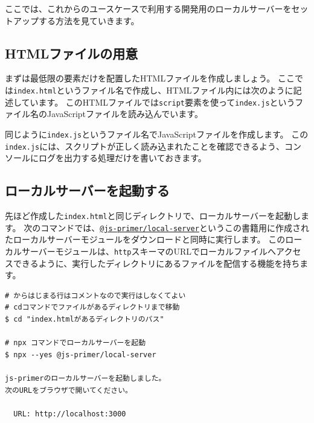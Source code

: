 ここでは、これからのユースケースで利用する開発用のローカルサーバーをセットアップする方法を見ていきます。

\hypertarget{preparing-html}{%
\subsection{HTMLファイルの用意}\label{preparing-html}}

まずは最低限の要素だけを配置したHTMLファイルを作成しましょう。
ここでは\texttt{index.html}というファイル名で作成し、HTMLファイル内には次のように記述しています。
このHTMLファイルでは\texttt{script}要素を使って\texttt{index.js}というファイル名のJavaScriptファイルを読み込んでいます。



同じように\texttt{index.js}というファイル名でJavaScriptファイルを作成します。
この\texttt{index.js}には、スクリプトが正しく読み込まれたことを確認できるよう、コンソールにログを出力する処理だけを書いておきます。



\hypertarget{open-js-primer-local-server}{%
\subsection{ローカルサーバーを起動する}\label{open-js-primer-local-server}}

先ほど作成した\texttt{index.html}と同じディレクトリで、ローカルサーバーを起動します。
次のコマンドでは、\href{https://github.com/js-primer/local-server}{\texttt{@js-primer/local-server}}というこの書籍用に作成されたローカルサーバーモジュールをダウンロードと同時に実行します。
このローカルサーバーモジュールは、\texttt{http}スキーマのURLでローカルファイルへアクセスできるように、実行したディレクトリにあるファイルを配信する機能を持ちます。

\begin{lstlisting}
# からはじまる行はコメントなので実行はしなくてよい
# cdコマンドでファイルがあるディレクトリまで移動
$ cd "index.htmlがあるディレクトリのパス"

# npx コマンドでローカルサーバーを起動
$ npx --yes @js-primer/local-server

js-primerのローカルサーバーを起動しました。
次のURLをブラウザで開いてください。

  URL: http://localhost:3000
\end{lstlisting}

